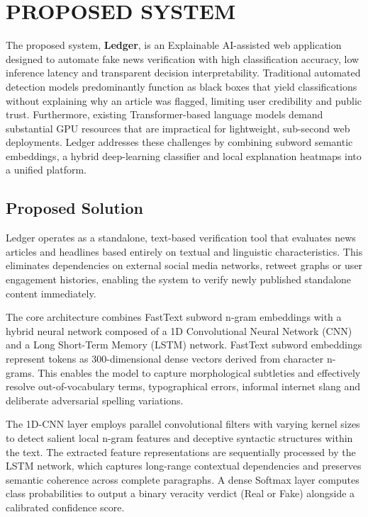 \documentclass[12pt,a4paper,oneside]{report}
\begin{document}
\chapter{PROPOSED SYSTEM}

The proposed system, \textbf{Ledger}, is an Explainable AI-assisted web application designed
to automate fake news verification with high classification accuracy, low inference latency
and transparent decision interpretability. Traditional automated detection models predominantly
function as black boxes that yield classifications without explaining why an article was flagged,
limiting user credibility and public trust. Furthermore, existing Transformer-based language
models demand substantial GPU resources that are impractical for lightweight, sub-second web
deployments. Ledger addresses these challenges by combining subword semantic embeddings, a
hybrid deep-learning classifier and local explanation heatmaps into a unified platform.

\section{Proposed Solution}

Ledger operates as a standalone, text-based verification tool that evaluates news articles
and headlines based entirely on textual and linguistic characteristics. This eliminates
dependencies on external social media networks, retweet graphs or user engagement histories,
enabling the system to verify newly published standalone content immediately.

The core architecture combines FastText subword n-gram embeddings with a hybrid neural network
composed of a 1D Convolutional Neural Network (CNN) and a Long Short-Term Memory (LSTM) network.
FastText subword embeddings represent tokens as 300-dimensional dense vectors derived from
character n-grams. This enables the model to capture morphological subtleties and effectively
resolve out-of-vocabulary terms, typographical errors, informal internet slang and deliberate
adversarial spelling variations.

The 1D-CNN layer employs parallel convolutional filters with varying kernel sizes to detect
salient local n-gram features and deceptive syntactic structures within the text. The extracted
feature representations are sequentially processed by the LSTM network, which captures
long-range contextual dependencies and preserves semantic coherence across complete paragraphs.
A dense Softmax layer computes class probabilities to output a binary veracity verdict (Real or
Fake) alongside a calibrated confidence score.
\end{document}
